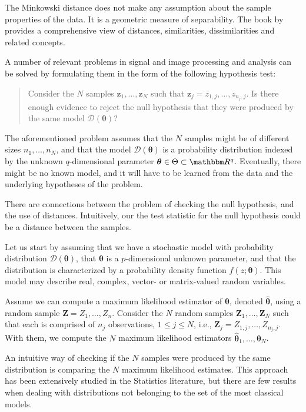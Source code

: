 \documentclass[12pt]{article}
\begin{document}
The Minkowski distance does not make any assumption about the sample properties of the data.
It is a geometric measure of separability.
The book by \citet{EncyclopediaofDistances} provides a comprehensive view of distances, similarities, dissimilarities and related concepts.

A number of relevant problems in signal and image processing and analysis can be solved by formulating them in the form of the following hypothesis test:
\begin{quote}
	Consider the $N$ samples $\bm z_1,\dots,\bm z_N$ such that $\bm z_j = z_{1,j}, \dots, z_{n_j,j}$.
	Is there enough evidence to reject the null hypothesis that they were produced by the same model $\mathcal D({\bm\theta})$?
\end{quote}
The aforementioned problem assumes that the $N$ samples might be of different sizes $n_1, \dots, n_N$, and that the model $\mathcal D({\bm\theta})$ is a probability distribution indexed by the unknown $q$-dimensional parameter ${\bm\theta}\in\Theta\subset \mathbbm R^q$.
Eventually, there might be no known model, and it will have to be learned from the data and the underlying hypotheses of the problem.


There are connections between the problem of checking the null hypothesis, and the use of distances.
Intuitively, our the test statistic for the null hypothesis could be a distance between the samples.

Let us start by assuming that we have a stochastic model with probability distribution $\mathcal D({\bm\theta})$, that ${\bm\theta}$ is a $p$-dimensional unknown parameter, and that the distribution is characterized by a probability density function $f(z;\bm{\theta})$.
This model may describe real, complex, vector- or matrix-valued random variables.

Assume we can compute a maximum likelihood estimator of ${\bm\theta}$, denoted $\widehat{\bm\theta}$, using a random sample $\bm Z = Z_1,\dots,Z_n$.
Consider the $N$ random samples $\bm Z_1,\dots,\bm Z_N$ such that each is comprised of $n_j$ observations, $1\leq j\leq N$, i.e., $\bm Z_j = Z_{1,j}, \dots, Z_{n_j,j}$.
With them, we compute the $N$ maximum likelihood estimators $\widehat{\bm\theta}_1,\dots,\widehat{\bm\theta}_N$.    

An intuitive way of checking if the $N$ samples were produced by the same distribution is comparing the $N$ maximum likelihood estimates.
This approach has been extensively studied in the Statistics literature, but there are few results when dealing with distributions not belonging to the set of the most classical models.
\end{document}
